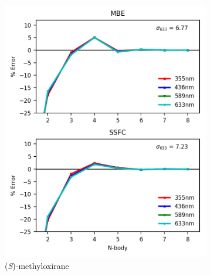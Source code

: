         \begin{figure}
            \begin{subfigure}{0.5\textwidth}
                \centering
                \includegraphics[scale=0.75]{p1/graphs/metox_7_tz_rot.png}
                \caption{(\textit{S})-methyloxirane}
                \label{metox_7_rot_tz}
            \end{subfigure}%
            \begin{subfigure}{0.5\textwidth}
                \centering

\end{subfigure}
\end{figure}
